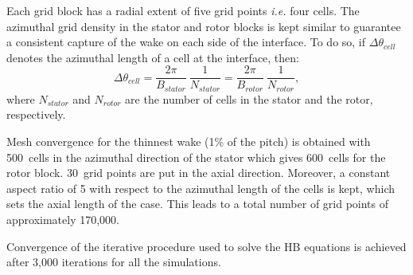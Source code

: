 Each grid block has a radial extent of five grid points \emph{i.e.} four cells. 
The azimuthal grid density in the stator and rotor blocks is kept similar
to guarantee a consistent capture of the wake on each side of the interface.
To do so, if $\Delta \theta_{cell}$ denotes the azimuthal length of a cell
at the interface, then:
\begin{equation}
   \Delta \theta_{cell} = \frac{2\pi}{B_{stator}}~\frac{1}{N_{stator}}
   = \frac{2\pi}{B_{rotor}}~\frac{1}{N_{rotor}},
   \label{eq:az_spatial_discretization_1}
\end{equation}
where $N_{stator}$ and $N_{rotor}$ are the number of cells
in the stator and the rotor, respectively. 

Mesh convergence for the thinnest wake (1\% of the pitch)
is obtained with 500~cells in the azimuthal direction of
the stator which gives
600~cells for the rotor block.
30~grid points are put in the axial direction. Moreover, a constant
aspect ratio of 5 with respect to the azimuthal length of the cells is
kept, which sets the axial length of the case.
This leads to a total number of grid points of approximately 
170,000. 

Convergence of the iterative procedure used to solve the HB equations is achieved 
after 3,000 iterations for 
all the simulations. 